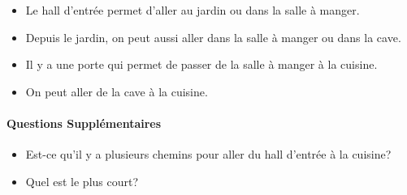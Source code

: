 \documentclass{article}
\begin{document}
\begin{itemize}
\item Le hall d'entrée permet d'aller au jardin ou dans la salle à manger.
\item Depuis le jardin, on peut aussi aller dans la salle à manger ou dans la cave.
\item Il y a une porte qui permet de passer de la salle à manger à la cuisine.
\item On peut aller de la cave à la cuisine.
\end{itemize}


\paragraph{Questions Supplémentaires}
\begin{itemize}
\item Est-ce qu'il y a plusieurs chemins pour aller du hall d'entrée à la cuisine?
\item Quel est le plus court?
\end{itemize}
\end{document}
